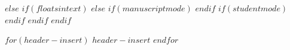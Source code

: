 \newenvironment{twocolumntable}%
{%
\begin{table}[!htbp]%
\onecolumn%
}%
{%
\twocolumn%
\end{table}%
}%
$else$
\makeatletter
\newif\ifapatablesownrule
\def\apatablesownbottomrule{\global\apatablesownruletrue}
\let\endoldlt\endlongtable
\def\endlongtable{
\ifapatablesownrule\noalign{\global\apatablesownrulefalse}\else\hline\fi
\endoldlt
}
\makeatother
$if(floatsintext)$
$else$
$if(manuscriptmode)$
\RequirePackage{longtable}
%
%
\RequirePackage{pdflscape}
$endif$
$if(studentmode)$
\RequirePackage{longtable}
\RequirePackage{pdflscape}
$endif$
$endif$
$endif$



$for(header-insert)$
$header-insert$
$endfor$

